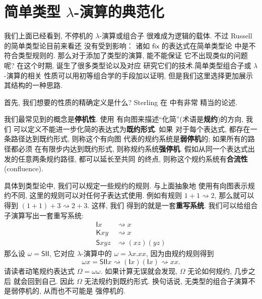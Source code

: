 \documentclass[UTF8]{ctexbook}
\newcommand{\cons}[1]{\textsf{#1}}
\theoremstyle{plain}
\theoremstyle{definition}
\theoremstyle{remark}
\begin{document}
\section{简单类型 \texorpdfstring{\(\lambda\)}{Lambda}-演算的典范化}
\label{beginning:ccc}
\begin{center}%
\end{center}

我们上面已经看到, 不停机的 \(\lambda\)-演算或组合子
很难成为逻辑的载体. 不过 Russell 的简单类型论目前来看还
没有受到影响： 诸如 \(\cons{fix}\) 的表达式在简单类型论
中是不符合类型规则的. 那么对于添加了类型的演算, 能不能保证
它不出现类似的问题呢? 在这个时期, 诞生了很多类型论以及对应
研究它们的技术.简单类型组合子或 \(\lambda\)-演算的相关
性质可以用初等组合学的手段加以证明\cite{loader:1998:stlc},
但是我们这里选择更加展示其结构的一种思路\cite[\S4.2]{sterling:2021:thesis}.

首先, 我们想要的性质的精确定义是什么? Sterling
在 \cite[\S5.1]{sterling:2021:thesis} 中有非常
精当的论述.

我们最常见到的概念是\textbf{停机性}. 使用
有向图来描述“化简”(术语是\textbf{规约})的方向, 我们
可以定义不能进一步化简的表达式为\textbf{既约形式}. 如果
对于每个表达式, 都存在一条路径达到既约形式, 则称这个有向图
代表的规约系统是\textbf{弱停机}的; 如果所有的路径都必须
在有限步内达到既约形式, 则称规约系统\textbf{强停机}.
假如从同一个表达式出发的任意两条规约路径, 都可以延长至共同
的终点, 则称这个规约系统有\textbf{合流性}(confluence).

具体到类型论中, 我们可以规定一些规约的规则. 与上面抽象地
使用有向图表示规约不同, 这里的规则可以对任何子表达式使用.
例如有规则 \(1 + 1 \rightsquigarrow 2\), 那么就可以
得到 \((1+1)+3 \rightsquigarrow 2 + 3\). 这样, 我们
得到的就是一套\textbf{重写系统}. 我们可以给组合子演算写出一套重写系统:
\[\begin{aligned}
\cons{I}x & \rightsquigarrow x\\
\cons{K}xy &\rightsquigarrow x\\
\cons{S}xyz &\rightsquigarrow (xz)(yz)
\end{aligned}\]
那么设 \(\omega = \cons{S}\cons{I}\cons{I}\),
它对应 \(\lambda\)-演算中的 \(\omega = \lambda x. xx\),
因为由规约规则得到
\[\omega x = \cons{S}\cons{I}\cons{I}x \rightsquigarrow (\cons{I}x)(\cons{I}x) \rightsquigarrow xx.\]
请读者动笔规约表达式 \(\Omega = \omega\omega\).
如果计算无误就会发现, \(\Omega\) 无论如何规约, 几步之后
就会回到自己. 因此 \(\Omega\) 无法规约到既约形式.
换句话说, 无类型的组合子演算不是弱停机的, 从而也不可能是
强停机的.
\end{document}

